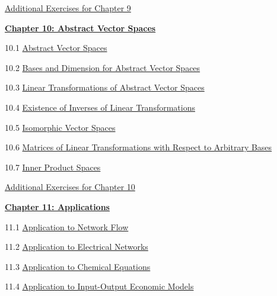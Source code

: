 \documentclass{ximera}
\begin{document}
\href{https://ximera.osu.edu/linearalgebradzv3/LinearAlgebraInteractiveIntro/SUPX-0090/main}{Additional Exercises for Chapter 9}
	
\href{https://ximera.osu.edu/linearalgebradzv3/LinearAlgebraInteractiveIntro/XLAChapter_vecSpaces/main}{\textbf{Chapter 10: Abstract Vector Spaces}}
	
10.1	\href{https://ximera.osu.edu/linearalgebradzv3/LinearAlgebraInteractiveIntro/VSP-0050/main}{Abstract Vector Spaces}
	
10.2	\href{https://ximera.osu.edu/linearalgebradzv3/LinearAlgebraInteractiveIntro/VSP-0060/main}{Bases and Dimension for Abstract Vector Spaces}
	
10.3	\href{https://ximera.osu.edu/linearalgebradzv3/LinearAlgebraInteractiveIntro/LTR-0022/main}{Linear Transformations of Abstract Vector Spaces}
	
10.4	\href{https://ximera.osu.edu/linearalgebradzv3/LinearAlgebraInteractiveIntro/LTR-0025/main}{Existence of Inverses of Linear Transformations}
	
10.5	\href{https://ximera.osu.edu/linearalgebradzv3/LinearAlgebraInteractiveIntro/LTR-0035/main}{Isomorphic Vector Spaces}
	
10.6	\href{https://ximera.osu.edu/linearalgebradzv3/LinearAlgebraInteractiveIntro/LTR-0060/main}{Matrices of Linear Transformations with Respect to Arbitrary Bases}
	
10.7	\href{https://ximera.osu.edu/linearalgebradzv3/LinearAlgebraInteractiveIntro/LTR-0080/main}{Inner Product Spaces}
	
\href{https://ximera.osu.edu/linearalgebradzv3/LinearAlgebraInteractiveIntro/SUPX-0100/main}{Additional Exercises for Chapter 10}
	
\href{https://ximera.osu.edu/linearalgebradzv3/LinearAlgebraInteractiveIntro/XLAChapter_applications/main}{\textbf{Chapter 11: Applications}}
	
11.1	\href{https://ximera.osu.edu/linearalgebradzv3/LinearAlgebraInteractiveIntro/APP-0010/main}{Application to Network Flow}
	
11.2	\href{https://ximera.osu.edu/linearalgebradzv3/LinearAlgebraInteractiveIntro/APP-0020/main}{Application to Electrical Networks}
	
11.3	\href{https://ximera.osu.edu/linearalgebradzv3/LinearAlgebraInteractiveIntro/APP-0030/main}{Application to Chemical Equations}
	
11.4	\href{https://ximera.osu.edu/linearalgebradzv3/LinearAlgebraInteractiveIntro/APP-0050/main}{Application to Input-Output Economic Models}
	
\end{document}
